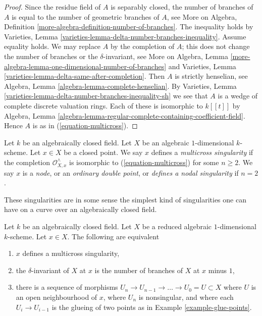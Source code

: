 \begin{proof}
Since the residue field of $A$ is separably closed, the number
of branches of $A$ is equal to the number of geometric branches
of $A$, see
More on Algebra, Definition \ref{more-algebra-definition-number-of-branches}.
The inequality holds by
Varieties, Lemma \ref{varieties-lemma-delta-number-branches-inequality}.
Assume equality holds.
We may replace $A$ by the completion of $A$; this does
not change the number of branches or the $\delta$-invariant, see
More on Algebra, Lemma
\ref{more-algebra-lemma-one-dimensional-number-of-branches}
and Varieties, Lemma \ref{varieties-lemma-delta-same-after-completion}.
Then $A$ is strictly henselian, see
Algebra, Lemma \ref{algebra-lemma-complete-henselian}.
By Varieties, Lemma \ref{varieties-lemma-delta-number-branches-inequality-sh}
we see that $A$ is a wedge of complete discrete valuation rings.
Each of these is isomorphic to $k[[t]]$ by Algebra, Lemma
\ref{algebra-lemma-regular-complete-containing-coefficient-field}.
Hence $A$ is as in (\ref{equation-multicross}).
\end{proof}

\begin{definition}
\label{definition-multicross}
Let $k$ be an algebraically closed field. Let $X$ be an algebraic
$1$-dimensional $k$-scheme. Let $x \in X$ be a closed point.
We say $x$ defines a {\it multicross singularity} if the completion
$\mathcal{O}_{X, x}^\wedge$
is isomorphic to (\ref{equation-multicross}) for some $n \geq 2$.
We say $x$ is a {\it node}, or an {\it ordinary double point}, or
{\it defines a nodal singularity} if $n = 2$.
\end{definition}

\noindent
These singularities are in some sense the simplest kind of singularities
one can have on a curve over an algebraically closed field.

\begin{lemma}
\label{lemma-multicross}
Let $k$ be an algebraically closed field. Let $X$ be a reduced algebraic
$1$-dimensional $k$-scheme. Let $x \in X$. The following are equivalent
\begin{enumerate}
\item $x$ defines a multicross singularity,
\item the $\delta$-invariant of $X$ at $x$ is the
number of branches of $X$ at $x$ minus $1$,
\item there is a sequence of morphisms
$U_n \to U_{n - 1} \to \ldots \to U_0 = U \subset X$
where $U$ is an open neighbourhood of $x$, where
$U_n$ is nonsingular, and where each $U_i \to U_{i - 1}$
is the glueing of two points as in Example \ref{example-glue-points}.
\end{enumerate}
\end{lemma}

